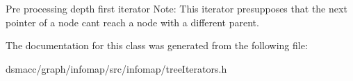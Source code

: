 Pre processing depth first iterator Note\+: This iterator presupposes that the next pointer of a node can\textquotesingle{}t reach a node with a different parent. 

The documentation for this class was generated from the following file\+:\begin{DoxyCompactItemize}
\item 
dsmacc/graph/infomap/src/infomap/tree\+Iterators.\+h\end{DoxyCompactItemize}
